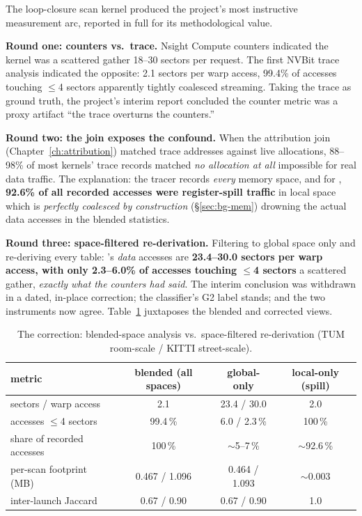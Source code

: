 The loop-closure scan kernel \stTrack{} produced the project's most instructive measurement arc, reported in full for its methodological value.

\textbf{Round one: counters vs.\ trace.} Nsight Compute counters indicated the kernel was a scattered gather 18--30 sectors per request. The first NVBit trace analysis indicated the opposite: 2.1 sectors per warp access, 99.4\% of accesses touching $\leq$4 sectors apparently tightly coalesced streaming. Taking the trace as ground truth, the project's interim report concluded the counter metric was a proxy artifact “the trace overturns the counters.”

\textbf{Round two: the join exposes the confound.} When the attribution join (Chapter~\ref{ch:attribution}) matched trace addresses against live allocations, 88--98\% of most kernels' trace records matched \emph{no allocation at all} impossible for real data traffic. The explanation: the tracer records \emph{every} memory space, and for \stTrack{}, \textbf{92.6\% of all recorded accesses were register-spill traffic} in local space which is \emph{perfectly coalesced by construction} (\S\ref{sec:bg-mem}) drowning the actual data accesses in the blended statistics.

\textbf{Round three: space-filtered re-derivation.} Filtering to global space only and re-deriving every table: \stTrack{}'s \emph{data} accesses are \textbf{23.4--30.0 sectors per warp access, with only 2.3--6.0\% of accesses touching $\leq$4 sectors} a scattered gather, \emph{exactly what the counters had said}. The interim conclusion was withdrawn in a dated, in-place correction; the classifier's G2 label stands; and the two instruments now agree. Table~\ref{tab:sttrack} juxtaposes the blended and corrected views.

\begin{table}[t]
\centering
\caption{The \stTrack{} correction: blended-space analysis vs.\ space-filtered re-derivation (TUM room-scale / KITTI street-scale).}
\label{tab:sttrack}
\begin{tabular}{@{}lccc@{}}
\toprule
metric & blended (all spaces) & global-only & local-only (spill) \\
\midrule
sectors / warp access & 2.1 & 23.4 / 30.0 & 2.0 \\
accesses $\leq$4 sectors & 99.4\,\% & 6.0 / 2.3\,\% & 100\,\% \\
share of recorded accesses & 100\,\% & $\sim$5--7\,\% & $\sim$92.6\,\% \\
per-scan footprint (MB) & 0.467 / 1.096 & 0.464 / 1.093 & $\sim$0.003 \\
inter-launch Jaccard & 0.67 / 0.90 & 0.67 / 0.90 & 1.0 \\
\bottomrule
\end{tabular}
\end{table}

